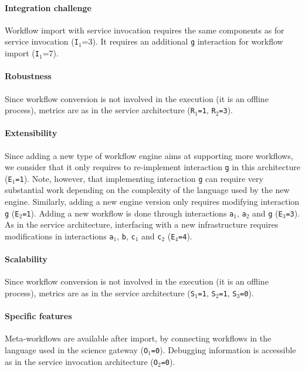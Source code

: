 \documentclass[preprint,3p,twocolumn]{elsarticle}
\begin{document}
\paragraph{Integration challenge} Workflow import with service invocation
requires the same components as for service invocation
(\texttt{I$_1$}=3). It requires an additional \texttt{g} interaction
for workflow import (\texttt{I$_1$}=7).

\paragraph{Robustness} Since workflow conversion is not involved in
the execution (it is an offline process), metrics are as in the
service architecture (\texttt{R$_1$=1}, \texttt{R$_2$=3}).

\paragraph{Extensibility} Since adding a new type of workflow engine
aims at supporting more workflows, we consider that it only requires
to re-implement interaction \texttt{g} in this architecture  (\texttt{E$_1$=1}). Note,
however, that implementing interaction \texttt{g} can require very
substantial work depending on the complexity of the language used by
the new engine. Similarly, adding a
new engine version only requires modifying interaction \texttt{g}
(\texttt{E$_2$=1}).  Adding a new workflow is done through
interactions \texttt{a$_1$}, \texttt{a$_2$} and \texttt{g} (\texttt{E$_3$=3}). As in the
service architecture, interfacing with a new infrastructure requires
modifications in interactions \texttt{a$_1$}, \texttt{b}, \texttt{c$_1$}
and \texttt{c$_2$} (\texttt{E$_4$=4}).

\paragraph{Scalability}  Since workflow conversion is not involved in
the execution (it is an offline process), metrics are as in the
service architecture (\texttt{S$_1$=1},
\texttt{S$_2$=1}, \texttt{S$_3$=0}).

\paragraph{Specific features} Meta-workflows are available after import,
by connecting workflows in the language used in the science gateway
(\texttt{O$_1$=0}). Debugging information is accessible as in the
service invocation architecture (\texttt{O$_2$=0}).
\end{document}
